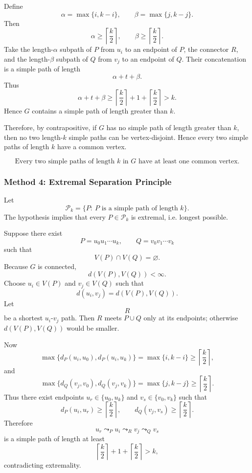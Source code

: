 \documentclass[12pt]{article}
\begin{document}
Define
\[
\alpha=\max\{i,k-i\},
\qquad
\beta=\max\{j,k-j\}.
\]
Then
\[
\alpha\ge \left\lceil \frac{k}{2}\right\rceil,
\qquad
\beta\ge \left\lceil \frac{k}{2}\right\rceil.
\]
Take the length-\(\alpha\) subpath of \(P\) from \(u_i\) to an endpoint of \(P\), the connector \(R\), and the length-\(\beta\) subpath of \(Q\) from \(v_j\) to an endpoint of \(Q\). Their concatenation is a simple path of length
\[
\alpha+t+\beta.
\]
Thus
\[
\alpha+t+\beta
\ge
\left\lceil \frac{k}{2}\right\rceil
+1+
\left\lceil \frac{k}{2}\right\rceil
>k.
\]
Hence \(G\) contains a simple path of length greater than \(k\).

Therefore, by contrapositive, if \(G\) has no simple path of length greater than \(k\), then no two length-\(k\) simple paths can be vertex-disjoint. Hence every two simple paths of length \(k\) have a common vertex.

\[
\boxed{\text{Every two simple paths of length }k\text{ in }G\text{ have at least one common vertex.}}
\]

\subsubsection{Method 4: Extremal Separation Principle}

Let
\[
\mathcal{P}_k=\{P:\ P\text{ is a simple path of length }k\}.
\]
The hypothesis implies that every \(P\in \mathcal{P}_k\) is extremal, i.e. longest possible.

Suppose there exist
\[
P=u_0u_1\cdots u_k,
\qquad
Q=v_0v_1\cdots v_k
\]
such that
\[
V(P)\cap V(Q)=\varnothing.
\]
Because \(G\) is connected,
\[
d(V(P),V(Q))<\infty.
\]
Choose \(u_i\in V(P)\) and \(v_j\in V(Q)\) such that
\[
d(u_i,v_j)=d(V(P),V(Q)).
\]
Let
\[
R
\]
be a shortest \(u_i\)-\(v_j\) path. Then \(R\) meets \(P\cup Q\) only at its endpoints; otherwise \(d(V(P),V(Q))\) would be smaller.

Now
\[
\max\{d_P(u_i,u_0),d_P(u_i,u_k)\}
=
\max\{i,k-i\}
\ge
\left\lceil\frac{k}{2}\right\rceil,
\]
and
\[
\max\{d_Q(v_j,v_0),d_Q(v_j,v_k)\}
=
\max\{j,k-j\}
\ge
\left\lceil\frac{k}{2}\right\rceil.
\]
Thus there exist endpoints \(u_r\in\{u_0,u_k\}\) and \(v_s\in\{v_0,v_k\}\) such that
\[
d_P(u_i,u_r)\ge \left\lceil\frac{k}{2}\right\rceil,
\qquad
d_Q(v_j,v_s)\ge \left\lceil\frac{k}{2}\right\rceil.
\]
Therefore
\[
u_r \leadsto_P u_i \leadsto_R v_j \leadsto_Q v_s
\]
is a simple path of length at least
\[
\left\lceil\frac{k}{2}\right\rceil
+
1
+
\left\lceil\frac{k}{2}\right\rceil
>k,
\]
contradicting extremality.
\end{document}
